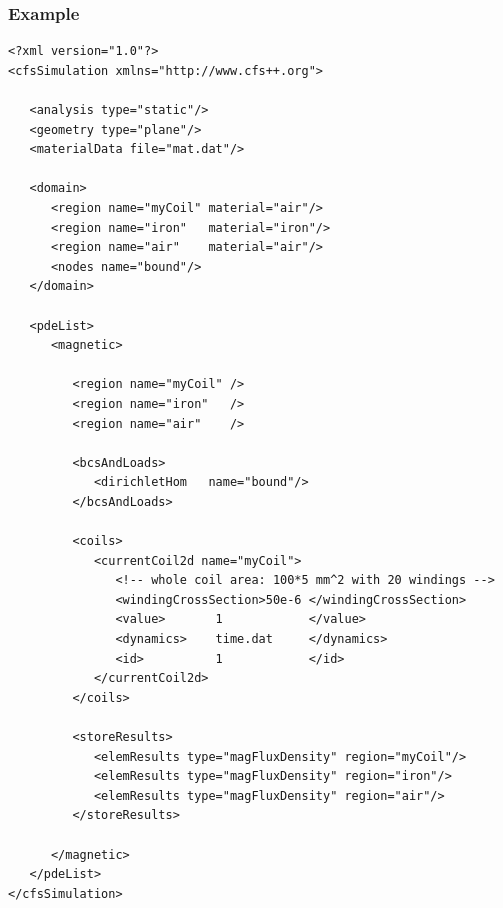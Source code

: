 \subsubsection{Example}
{\footnotesize
\begin{verbatim}
<?xml version="1.0"?>
<cfsSimulation xmlns="http://www.cfs++.org">

   <analysis type="static"/>
   <geometry type="plane"/>
   <materialData file="mat.dat"/>

   <domain>
      <region name="myCoil" material="air"/>
      <region name="iron"   material="iron"/>
      <region name="air"    material="air"/>
      <nodes name="bound"/>
   </domain>

   <pdeList>
      <magnetic>

         <region name="myCoil" />
         <region name="iron"   />
         <region name="air"    />

         <bcsAndLoads>
            <dirichletHom   name="bound"/>
         </bcsAndLoads>

         <coils>
            <currentCoil2d name="myCoil">
               <!-- whole coil area: 100*5 mm^2 with 20 windings -->
               <windingCrossSection>50e-6 </windingCrossSection>
               <value>       1            </value>
               <dynamics>    time.dat     </dynamics>
               <id>          1            </id>
            </currentCoil2d>
         </coils>

         <storeResults>
            <elemResults type="magFluxDensity" region="myCoil"/>
            <elemResults type="magFluxDensity" region="iron"/>
            <elemResults type="magFluxDensity" region="air"/>
         </storeResults>

      </magnetic>
   </pdeList>
</cfsSimulation>
\end{verbatim}
}
